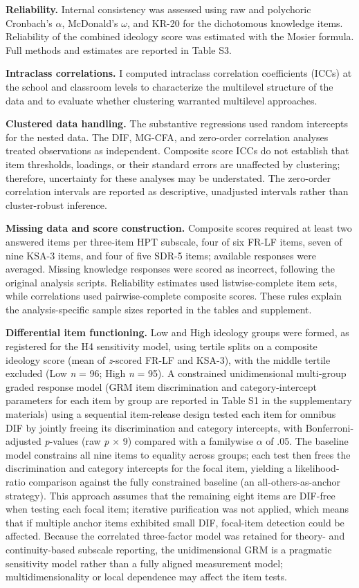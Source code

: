 \documentclass[
  12pt,
]{article}
\begin{document}
\textbf{Reliability.} Internal consistency was assessed using raw and
polychoric Cronbach's \(\alpha\), McDonald's \(\omega\), and KR-20 for
the dichotomous knowledge items. Reliability of the combined ideology
score was estimated with the Mosier formula. Full methods and estimates
are reported in Table S3.

\textbf{Intraclass correlations.} I computed intraclass correlation
coefficients (ICCs) at the school and classroom levels to characterize
the multilevel structure of the data and to evaluate whether
clustering warranted multilevel approaches.

\textbf{Clustered data handling.} The substantive regressions used
random intercepts for the nested data. The DIF, MG-CFA, and zero-order
correlation analyses treated observations as independent. Composite
score ICCs do not establish that item thresholds, loadings, or their
standard errors are unaffected by clustering; therefore, uncertainty
for these analyses may be understated. The zero-order correlation
intervals are reported as descriptive, unadjusted intervals rather than
cluster-robust inference.

\textbf{Missing data and score construction.} Composite scores required
at least two answered items per three-item HPT
subscale, four of six FR-LF items, seven of nine KSA-3 items, and four
of five SDR-5 items; available responses were averaged. Missing
knowledge responses were scored as incorrect, following the original
analysis scripts. Reliability estimates used listwise-complete item
sets, while correlations used pairwise-complete composite scores. These
rules explain the analysis-specific sample sizes reported in the tables
and supplement.

\textbf{Differential item functioning.} Low and High ideology groups were formed, as registered for the H4 sensitivity model, using tertile splits on a composite ideology score (mean of \emph{z}-scored FR-LF and KSA-3), with the middle tertile excluded (Low \emph{n} = 96; High \emph{n} = 95). A constrained unidimensional multi-group graded response model (GRM item
discrimination and category-intercept parameters for each item by group are
reported in Table S1 in the supplementary materials) using a
sequential item-release design tested each item for omnibus DIF by
jointly freeing its discrimination and category intercepts, with
Bonferroni-adjusted \emph{p}-values (raw \emph{p} \(\times\) 9) compared
with a familywise \(\alpha\) of .05. The
baseline model constrains all nine items to equality across groups;
each test then frees the discrimination and category intercepts for
the focal item, yielding a likelihood-ratio comparison against the
fully constrained baseline (an all-others-as-anchor strategy). This
approach assumes that the remaining eight items are DIF-free when
testing each focal item; iterative purification was not applied, which
means that if multiple anchor items exhibited small DIF, focal-item
detection could be affected.
Because the correlated three-factor model was retained for theory- and
continuity-based subscale reporting, the unidimensional GRM
is a pragmatic sensitivity model rather than a fully aligned
measurement model; multidimensionality or local dependence may affect
the item tests.
\end{document}
